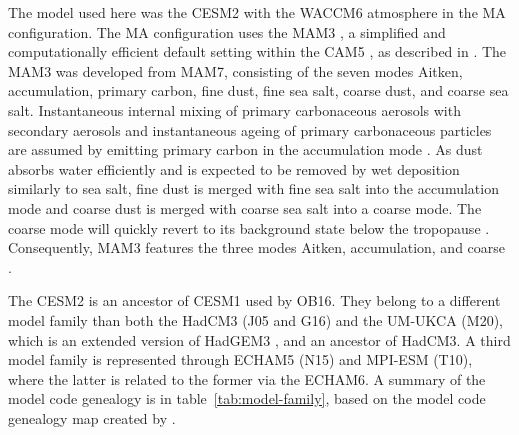 \documentclass[draft]{agujournal2019}
\begin{document}
  The model used here was the CESM2 with the WACCM6 atmosphere in the MA configuration.
  The MA configuration uses the MAM3 \cite{gettleman2019}, a simplified and
  computationally efficient default setting within the CAM5 \cite{liu2016}, as described
  in . The MAM3 was developed from MAM7, consisting of the seven modes
  Aitken, accumulation, primary carbon, fine dust, fine sea salt, coarse dust, and
  coarse sea salt. Instantaneous internal mixing of primary carbonaceous aerosols with
  secondary aerosols and instantaneous ageing of primary carbonaceous particles are
  assumed by emitting primary carbon in the accumulation mode \cite{liu2016}. As dust
  absorbs water efficiently and is expected to be removed by wet deposition similarly to
  sea salt, fine dust is merged with fine sea salt into the accumulation mode and coarse
  dust is merged with coarse sea salt into a coarse mode. The coarse mode will quickly
  revert to its background state below the tropopause \cite{liu2012}. Consequently, MAM3
  features the three modes Aitken, accumulation, and coarse \cite{liu2016}.

  The CESM2 is an ancestor of CESM1 used by OB16. They belong to a different model
  family than both the HadCM3 (J05 and G16) and the UM-UKCA (M20), which is an extended
  version of HadGEM3 \cite{dhomse2014}, and an ancestor of HadCM3. A third model family
  is represented through ECHAM5 (N15) and MPI-ESM (T10), where the latter is related to
  the former via the ECHAM6. A summary of the model code genealogy is in
  table~\ref{tab:model-family}, based on the model code genealogy map created by
  .
\end{document}
